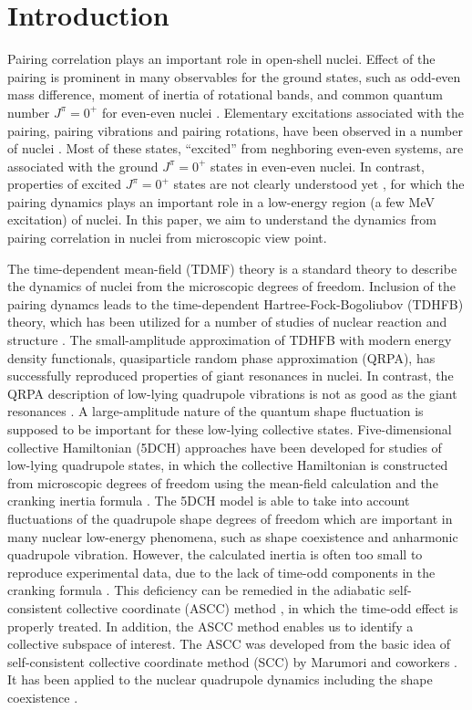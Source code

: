 \documentclass[%
superscriptaddress,
showpacs,
nofootinbib,
amsmath,amssymb,
aps,
prc,
twocolumn,
floatfix ]%
{revtex4-1}
\begin{document}
\section{Introduction}
Pairing correlation plays an important role in open-shell nuclei.
Effect of the pairing is prominent in many observables for the ground states,
such as odd-even mass difference, moment of inertia of rotational bands,
and common quantum number $J^\pi=0^+$ for even-even nuclei \cite{RS80}.
Elementary excitations associated with the pairing,
pairing vibrations and pairing rotations,
have been observed in a number of nuclei \cite{BB05}.
Most of these states, ``excited'' from neghboring even-even systems,
are associated with the ground $J^\pi=0^+$ states in even-even nuclei.
In contrast, properties of excited $J^{\pi}=0^+$ states are not clearly
understood yet \cite{HW11, G01}, for which the pairing dynamics plays
an important role in a low-energy region (a few MeV excitation) of nuclei. 
In this paper,
we aim to understand the dynamics from pairing correlation in nuclei
from microscopic view point.

The time-dependent mean-field (TDMF) theory is a standard theory to describe
the dynamics of nuclei from the microscopic degrees of freedom.
Inclusion of the pairing dynamcs leads to the
time-dependent Hartree-Fock-Bogoliubov (TDHFB) theory,
which has been utilized for a number of studies of nuclear reaction
and structure \cite{NMMY16}.
The small-amplitude approximation of TDHFB with modern energy density
functionals, quasiparticle random phase approximation (QRPA), 
has successfully reproduced properties of giant resonances in nuclei.
In contrast, the QRPA description of low-lying quadrupole vibrations
is not as good as the giant resonances \cite{NMMY16}.
A large-amplitude nature of the quantum shape fluctuation is supposed to
be important for these low-lying collective states.
Five-dimensional collective Hamiltonian (5DCH) approaches
have been developed for studies of low-lying quadrupole states,
in which the collective Hamiltonian is constructed from
microscopic degrees of freedom using the mean-field calculation and
the cranking inertia formula \cite{Bar11,Del10,Fu13}.
The 5DCH model is able to take into account fluctuations of
the quadrupole shape degrees of freedom which are important in many
nuclear low-energy phenomena, such as
shape coexistence and anharmonic quadrupole vibration.
However, the calculated inertia is often too small to reproduce
experimental data, due to the lack of time-odd components
in the cranking formula \cite{RS80}.
This deficiency can be remedied in the adiabatic self-consistent collective
coordinate (ASCC) method \cite{MNM00},
in which the time-odd effect is properly treated.
In addition, the ASCC method enables us to identify a collective subspace
of interest.
The ASCC was developed from the basic idea of self-consistent
collective coordinate method (SCC) by Marumori and coworkers \cite{MMSK80}.
It has been applied to the nuclear quadrupole dynamics including
the shape coexistence \cite{KNMM05, HNMM07, HNMM08}.
\end{document}

